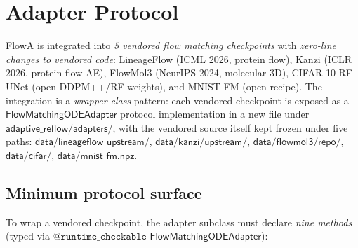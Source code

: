 \documentclass[journal,twocolumn,final]{IEEEtran}
\begin{document}
\section{Adapter Protocol}\label{sec:adapter}

FlowA is integrated into \emph{5 vendored flow matching checkpoints} with
\emph{zero-line changes to vendored code}: LineageFlow (ICML 2026, protein
flow), Kanzi (ICLR 2026, protein flow-AE), FlowMol3 (NeurIPS 2024, molecular
3D), CIFAR-10 RF UNet (open DDPM++/RF weights), and MNIST FM (open recipe).
The integration is a \emph{wrapper-class} pattern: each vendored checkpoint
is exposed as a $\mathsf{FlowMatchingODEAdapter}$ protocol implementation in a
new file under $\mathsf{adaptive\_reflow/adapters/}$, with the vendored source
itself kept frozen under five paths:
$\mathsf{data/lineageflow\_upstream/}$,
$\mathsf{data/kanzi/upstream/}$,
$\mathsf{data/flowmol3/repo/}$,
$\mathsf{data/cifar/}$,
$\mathsf{data/mnist\_fm.npz}$.

\subsection{Minimum protocol surface}

To wrap a vendored checkpoint, the adapter subclass must declare \emph{nine
methods} (typed via $\texttt{@runtime\_checkable}$
$\mathsf{FlowMatchingODEAdapter}$):
\end{document}
